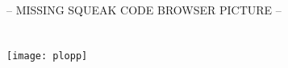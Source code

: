 \stMessageSendingDefinition

\paragraph{\stUnaryMessagesTerm}

\stUnaryMessagesDefinition

\paragraph{\stBinaryMessagesTerm}

\stBinaryMessagesDefinition

\paragraph{\stKeywordMessagesTerm}

\stKeywordMessagesDefinition

\subsection{\stBlockTerm}

\stBlockDefinition

\section{\stDevelopmentEnvironmentTerm}

\stDevelopmentEnvironmentDefinition


-- MISSING SQUEAK CODE BROWSER PICTURE --

\section{\stImplementationTerm}

\stImplementationDefinition

\pagebreak{}

\section{\stApplicationsTerm}

\stApplicationsDefinition

 \begin{center}
   \texttt{[image: plopp]}\\
   \stPloppDrawingSessionTerm
 \end{center}

